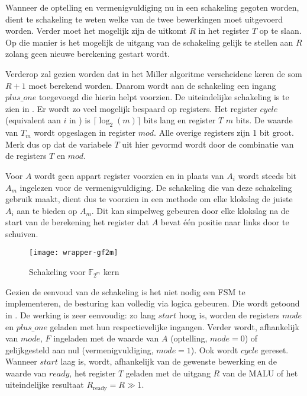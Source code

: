 Wanneer de optelling en vermenigvuldiging nu in een schakeling gegoten worden, dient te schakeling te weten welke van de twee bewerkingen moet uitgevoerd worden. Verder moet het mogelijk zijn de uitkomt $R$ in het register $T$ op te slaan. Op die manier is het mogelijk de uitgang van de schakeling gelijk te stellen aan $R$ zolang geen nieuwe berekening gestart wordt.  

Verderop zal gezien worden dat in het Miller algoritme verscheidene keren de som $R + 1$ moet berekend worden. Daarom wordt aan de schakeling een ingang $plus\_one$ toegevoegd die hierin helpt voorzien. De uiteindelijke schakeling is te zien in . Er wordt zo veel mogelijk bespaard op registers. Het register $cycle$ (equivalent aan $i$ in ) is $\lceil \log _2 (m) \rceil$ bits lang en register $T$ $m$ bits. De waarde van $T_m$ wordt opgeslagen in register $mod$. Alle overige registers zijn 1 bit groot. Merk dus op dat de variabele $T$ uit  hier gevormd wordt door de combinatie van de registers $T$ en $mod$. 

Voor $A$ wordt geen appart register voorzien en in plaats van $A_i$ wordt steeds bit $A_m$ ingelezen voor de vermenigvuldiging. De schakeling die van deze schakeling gebruik maakt, dient dus te voorzien in een methode om elke klokslag de juiste $A_i$ aan te bieden op $A_m$. Dit kan simpelweg gebeuren door elke klokslag na de start van de berekening het register dat $A$ bevat \'e\'en positie naar links door te schuiven.

\begin{figure}[h]
	\centering
		\texttt{[image: wrapper-gf2m]}
		\caption{Schakeling voor $\mathbb{F}_{2^m}$ kern\label{figuur-implementatie-wrapper-gf2m}}
\end{figure}

Gezien de eenvoud van de schakeling is het niet nodig een FSM te implementeren, de besturing kan volledig via logica gebeuren. Die wordt getoond in . De werking is zeer eenvoudig: zo lang $start$ hoog is, worden de registers $mode$ en $plus\_one$ geladen met hun respectievelijke ingangen. Verder wordt, afhankelijk van $mode$, $F$ ingeladen met de waarde van $A$ (optelling, $mode = 0$) of gelijkgesteld aan nul (vermenigvuldiging, $mode = 1$). Ook wordt $cycle$ gereset. Wanneer $start$ laag is, wordt, afhankelijk van de gewenste bewerking en de waarde van $ready$, het register $T$ geladen met de uitgang $R$ van de MALU of het uiteindelijke resultaat $R_{\text{ready}} = R \gg 1$.

